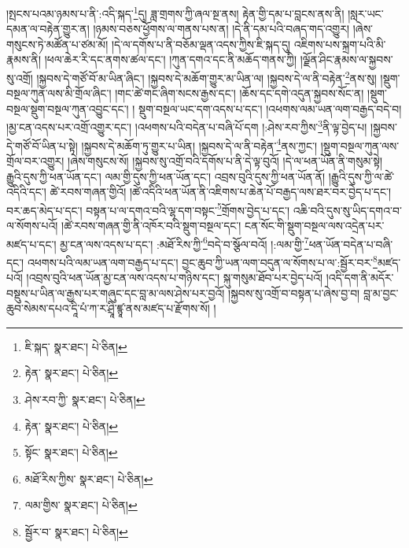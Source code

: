 །སྤངས་པའམ་ཉམས་པ་ནི་:འདི་སྐད་\footnote{ཇི་སྐད་  སྣར་ཐང་།  པེ་ཅིན། }དུ། ཟླ་གྲགས་ཀྱི་ཞལ་སྔ་ནས། རྟེན་གྱི་དམ་པ་བླངས་ནས་ནི། །སླར་ཡང་དམན་ལ་བརྟེན་གྱུར་ན། །ཉམས་བཅས་ཕྱོགས་ལ་གནས་པས་ན། །དེ་ནི་དམ་པའི་བཞད་གད་འགྱུར། །ཞེས་གསུངས་ཏེ་མཚོན་པ་ཙམ་མོ། །དེ་ལ་དགོས་པ་ནི་བཅོམ་ལྡན་འདས་ཀྱིས་ཇི་སྐད་དུ། འཇིགས་པས་སྐྲག་པའི་མི་རྣམས་ནི། །ཕལ་ཆེར་རི་དང་ནགས་ཚལ་དང་། །ཀུན་དགའ་དང་ནི་མཆོད་གནས་ཀྱི། །ལྗོན་ཤིང་རྣམས་ལ་སྐྱབས་སུ་འགྲོ། །སྐྱབས་དེ་གཙོ་བོ་མ་ཡིན་ཞིང་། །སྐྱབས་དེ་མཆོག་གྱུར་མ་ཡིན་ལ། །སྐྱབས་དེ་ལ་ནི་བརྟེན་\footnote{རྟེན་  སྣར་ཐང་།  པེ་ཅིན། }ནས་སུ། །སྡུག་བསྔལ་ཀུན་ལས་མི་གྲོལ་ཞིང་། །གང་ཚེ་གང་ཞིག་སངས་རྒྱས་དང་། །ཆོས་དང་དགེ་འདུན་སྐྱབས་སོང་ན། །སྡུག་བསྔལ་སྡུག་བསྔལ་ཀུན་འབྱུང་དང་། །
སྡུག་བསྔལ་ཡང་དག་འདས་པ་དང་། །འཕགས་ལམ་ཡན་ལག་བརྒྱད་བདེ་བ། །མྱ་ངན་འདས་པར་འགྲོ་འགྱུར་དང་། །འཕགས་པའི་བདེན་པ་བཞི་པོ་དག །:ཤེས་རབ་ཀྱིས་\footnote{ཤེས་རབ་ཀྱི་  སྣར་ཐང་།  པེ་ཅིན། }ནི་ལྟ་བྱེད་པ། །སྐྱབས་དེ་གཙོ་བོ་ཡིན་པ་སྟེ། །སྐྱབས་དེ་མཆོག་ཏུ་གྱུར་པ་ཡིན། །སྐྱབས་དེ་ལ་ནི་བརྟེན་\footnote{རྟེན་  སྣར་ཐང་།  པེ་ཅིན། }ནས་ཀྱང་། །སྡུག་བསྔལ་ཀུན་ལས་གྲོལ་བར་འགྱུར། །ཞེས་གསུངས་སོ། །སྐྱབས་སུ་འགྲོ་བའི་དགོས་པ་ནི་དེ་ལྟ་བུའོ། །དེ་ལ་ཕན་ཡོན་ནི་གསུམ་སྟེ། རྒྱུའི་དུས་ཀྱི་ཕན་ཡོན་དང་། ལམ་གྱི་དུས་ཀྱི་ཕན་ཡོན་དང་། འབྲས་བུའི་དུས་ཀྱི་ཕན་ཡོན་ནོ། །རྒྱུའི་དུས་ཀྱི་ལ་ཚེ་འདིའི་དང་། ཚེ་རབས་གཞན་གྱིའོ། །ཚེ་འདིའི་ཕན་ཡོན་ནི་འཇིགས་པ་ཆེན་པོ་བརྒྱད་ལས་ཐར་བར་བྱེད་པ་དང་། བར་ཆད་མེད་པ་དང་། བསྟན་པ་ལ་དགའ་བའི་ལྷ་དག་བསྟང་\footnote{སྟོང་  སྣར་ཐང་།  པེ་ཅིན། }གྲོགས་བྱེད་པ་དང་། འཆི་བའི་དུས་སུ་ཡིད་དགའ་བ་ལ་སོགས་པའོ། །ཚེ་རབས་གཞན་གྱི་ནི་འཁོར་བའི་སྡུག་བསྔལ་དང་། ངན་སོང་གི་སྡུག་བསྔལ་ལས་འདྲེན་པར་མཛད་པ་དང་། མྱ་ངན་ལས་འདས་པ་དང་། :མཐོ་རིས་ཀྱི་\footnote{མཐོ་རིས་ཀྱིས་  སྣར་ཐང་།  པེ་ཅིན། }བདེ་བ་སྩོལ་བའོ། །:ལམ་གྱི་\footnote{ལམ་གྱིས་  སྣར་ཐང་།  པེ་ཅིན། }ཕན་ཡོན་བདེན་པ་བཞི་དང་། འཕགས་པའི་ལམ་ཡན་ལག་བརྒྱད་པ་དང་། བྱང་ཆུབ་ཀྱི་ཡན་ལག་བདུན་ལ་སོགས་པ་ལ་:སྦྱོར་བར་\footnote{སྦྱོར་བ་  སྣར་ཐང་།  པེ་ཅིན། }མཛད་པའོ། །འབྲས་བུའི་ཕན་ཡོན་མྱ་ངན་ལས་འདས་པ་གཉིས་དང་། སྐུ་གསུམ་ཐོབ་པར་བྱེད་པའོ། །འདི་དག་ནི་མདོར་བསྡུས་པ་ཡིན་ལ་རྒྱས་པར་གཞུང་དང་བླ་མ་ལས་ཤེས་པར་བྱའོ། །སྐྱབས་སུ་འགྲོ་བ་བསྟན་པ་ཞེས་བྱ་བ། བླ་མ་བྱང་ཆུབ་སེམས་དཔའ་དཱི་པཾ་ཀ་ར་ཤྲཱི་ཛྙཱ་ནས་མཛད་པ་རྫོགས་སོ། ། 